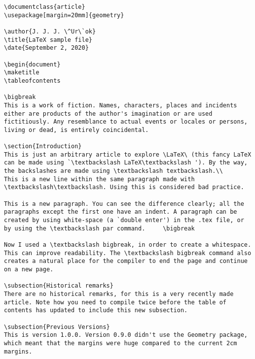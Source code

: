 \documentclass{article}
\begin{document}
\begin{lstlisting}[breaklines=true, basicstyle=\small]
\documentclass{article}
\usepackage[margin=20mm]{geometry}

\author{J. J. J. \^Ur\`ok}
\title{LaTeX sample file}
\date{September 2, 2020}

\begin{document}
\maketitle
\tableofcontents

\bigbreak
This is a work of fiction. Names, characters, places and incidents either are products of the author's imagination or are used fictitiously. Any resemblance to actual events or locales or persons, living or dead, is entirely coincidental.

\section{Introduction}
This is just an arbitrary article to explore \LaTeX\ (this fancy LaTeX can be made using `\textbackslash LaTeX\textbackslash '). By the way, the backslashes are made using \textbackslash textbackslash.\\
This is a new line within the same paragraph made with \textbackslash\textbackslash. Using this is considered bad practice.

This is a new paragraph. You can see the difference clearly; all the paragraphs except the first one have an indent. A paragraph can be created by using white-space (a `double enter') in the .tex file, or by using the \textbackslash par command.     \bigbreak

Now I used a \textbackslash bigbreak, in order to create a whitespace. This can improve readability. The \textbackslash bigbreak command also creates a natural place for the compiler to end the page and continue on a new page.

\subsection{Historical remarks}
There are no historical remarks, for this is a very recently made article. Note how you need to compile twice before the table of contents has updated to include this new subsection.

\subsection{Previous Versions}
This is version 1.0.0. Version 0.9.0 didn't use the Geometry package, which meant that the margins were huge compared to the current 2cm margins.


\end{lstlisting}
\end{document}
